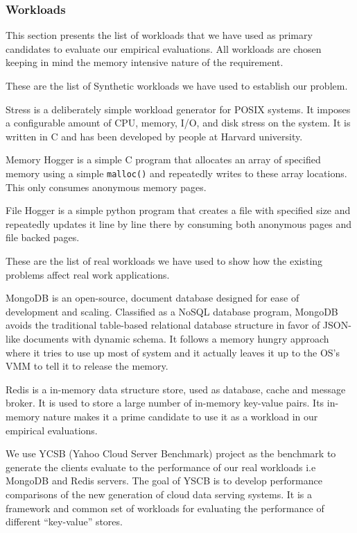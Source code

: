      \subsubsection{Workloads}
      
	This section presents the list of workloads that we have used as primary candidates to evaluate our empirical evaluations. All 
    workloads are chosen keeping in mind the memory intensive nature of the requirement.  
	
	These are the list of Synthetic workloads we have used to establish our problem.
	  
	    Stress \cite{stress} is a deliberately simple workload generator for POSIX systems. It imposes a configurable amount of CPU, 
    memory, I/O, and disk stress on the system. It is written in C and has been developed by people at Harvard university. 
	  
	    Memory Hogger is a simple C program that allocates an array of specified memory using a simple \texttt{malloc()} and repeatedly 
    writes to these array locations. This only consumes anonymous memory pages.
	  
	    File Hogger is a simple python program that creates a file with specified size and repeatedly updates it line by line there by 
    consuming both anonymous pages and file backed pages.

	These are the list of real workloads we have used to show how the existing problems affect real work applications.
	  
	    MongoDB \cite{Mongodb} is an open-source, document database designed for ease of development and scaling. Classified as a NoSQL 
    database program, MongoDB avoids the traditional table-based relational database structure in favor of JSON-like documents with dynamic 
    schema. It follows a memory hungry approach where it tries to use up most of system and it actually leaves it up to the OS's VMM to tell it 
    to release the memory.

	    Redis \cite{redis} is a in-memory data structure store, used as database, cache and message broker. It is used to store a large 
    number of in-memory key-value pairs. Its in-memory nature makes it a prime candidate to use it as a workload in our empirical evaluations.
      
	    We use YCSB \cite{cooper2010benchmarking} (Yahoo Cloud Server Benchmark) project as the benchmark to generate the clients evaluate 
    to the performance of our real workloads i.e MongoDB and Redis servers. The goal of YSCB is to develop performance comparisons of the new 
    generation of cloud data serving systems. It is a framework and common set of workloads for evaluating the performance of different 
    “key-value” stores.
    
